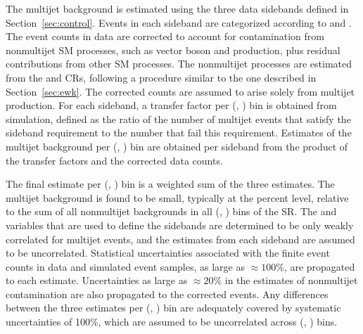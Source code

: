 The multijet background is estimated using the three data sidebands
defined in Section~\ref{sec:control}.
Events in each sideband are categorized according to \njet and
\scalht. The event counts in data are corrected to account for
contamination from nonmultijet SM processes, such as vector boson and
\ttbar production, plus residual contributions from other SM
processes. The nonmultijet processes are estimated from the \mj and
\mmj CRs, following a procedure similar to the one described in
Section~\ref{sec:ewk}. The corrected counts are assumed to arise
solely from multijet production.
%
For each sideband, a transfer factor per (\njet, \scalht) bin is
obtained from simulation, defined as the ratio of the number of
multijet events that satisfy the sideband requirement to the number
that fail this requirement. Estimates of the multijet background per
(\njet, \scalht) bin are obtained per sideband from the product of the
transfer factors and the corrected data counts.

The final estimate per (\njet, \scalht) bin is a weighted sum of the
three estimates. The multijet background is found to be small,
typically at the percent level, relative to the sum of all nonmultijet
backgrounds in all (\njet, \nb) bins of the SR.
%
The \mhtmet and \bdphi variables that are used to define the sidebands
are determined to be only weakly correlated for multijet events, and
the estimates from each sideband are assumed to be uncorrelated.
%
Statistical uncertainties associated with the finite event counts in
data and simulated event samples, as large as ${\approx}100\%$, are
propagated to each estimate. Uncertainties as large as ${\approx}20\%$
in the estimates of nonmultijet contamination
are also propagated to the corrected events. 
%
Any differences between the three estimates per (\njet, \scalht) bin
are adequately covered by systematic uncertainties of 100\%, which are
assumed to be uncorrelated across (\njet, \scalht) bins.

